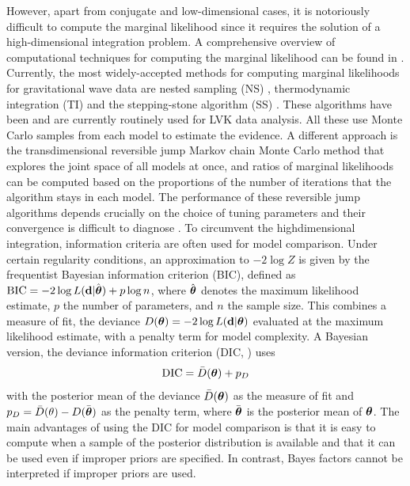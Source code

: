 \documentclass[%
 reprint,
 amsmath,amssymb,
 aps,
]{revtex4-2}
\def\ybold{\mathbf{d}}
\newcommand{\btheta}{\mbox{\boldmath $\theta$}}
\begin{document}
However, apart from conjugate and low-dimensional cases, it is notoriously difficult to compute the marginal likelihood since it requires the solution of a high-dimensional integration problem. 
%
A comprehensive overview of computational techniques for computing the marginal likelihood can be found in
\cite{RobertCP2009CmfB, GelmanAndrew2014, ChristensenNelson2022Pewg}.
Currently, the most widely-accepted methods for computing marginal likelihoods for gravitational wave data are nested sampling (NS) \cite{skilling2006nested, veitch2010bayesian}, thermodynamic integration (TI) \cite{gelman1998simulating, lartillot2006computing} and the stepping-stone algorithm (SS) \cite{xie2011improving, maturana2019stepping}. These algorithms have been and are currently routinely used for LVK data analysis. All these use Monte Carlo samples from each model to estimate the evidence. A different approach is the transdimensional reversible jump Markov chain Monte Carlo method \cite{green1995reversible, umstatter2005bayesian} that explores the joint space of all models at once, and ratios of marginal likelihoods can be computed based on the proportions of the number of iterations that the algorithm stays in each model. The performance of these reversible jump algorithms depends crucially on the choice of tuning parameters and their convergence is difficult to diagnose \cite{Somo2020CTfT}.
To circumvent the highdimensional integration, information criteria are often used for model comparison.
Under certain regularity conditions, an approximation to $-2\log Z$ is given by the frequentist Bayesian information criterion (BIC), defined as $\mbox{BIC}=-2\log L(\ybold|\hat{\btheta}) +p\log n$,
where $\hat{\btheta}$ denotes the maximum likelihood estimate, $p$ the number of parameters, and $n$ the sample size. This combines a measure of fit, the deviance $D(\btheta)= -2\log L(\ybold|\btheta)$ evaluated at the maximum likelihood estimate, with a penalty term for model complexity. A Bayesian version, the deviance information criterion (DIC, \cite{spiegelhalter2002bayesian}) uses
\[\mbox{DIC}=\bar{D}(\btheta) +p_D \]
with the posterior mean of the deviance $\bar{D}(\btheta)$  as the measure of fit and $p_D=\bar{D}(\theta)-D(\bar{\btheta})$ as the penalty term, where $\bar{\btheta}$ is the posterior mean of $\btheta$. The main advantages of using the DIC for model comparison is that it is easy to compute when a sample of the posterior distribution is available and that it can be used even if improper priors are specified. In contrast, Bayes factors cannot be interpreted if improper priors are used.
\end{document}

